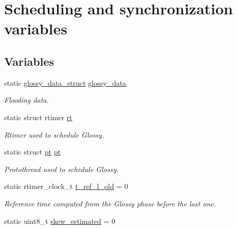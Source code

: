 \hypertarget{group__glossy-test-variables-sched-sync}{
\section{Scheduling and synchronization variables}
\label{group__glossy-test-variables-sched-sync}
}
\subsection*{Variables}
\begin{DoxyCompactItemize}
\item 
\hypertarget{group__glossy-test-variables-sched-sync_ga6bbf497010a2f415af13dbc5c4910f02}{
static \hyperlink{structglossy__data__struct}{glossy\_\-data\_\-struct} \hyperlink{group__glossy-test-variables-sched-sync_ga6bbf497010a2f415af13dbc5c4910f02}{glossy\_\-data}}
\label{group__glossy-test-variables-sched-sync_ga6bbf497010a2f415af13dbc5c4910f02}

\begin{DoxyCompactList}\small\item\em Flooding data. \end{DoxyCompactList}\item 
\hypertarget{group__glossy-test-variables-sched-sync_ga1d5d05d50b1e23d2c49218d89872754b}{
static struct rtimer \hyperlink{group__glossy-test-variables-sched-sync_ga1d5d05d50b1e23d2c49218d89872754b}{rt}}
\label{group__glossy-test-variables-sched-sync_ga1d5d05d50b1e23d2c49218d89872754b}

\begin{DoxyCompactList}\small\item\em Rtimer used to schedule Glossy. \end{DoxyCompactList}\item 
\hypertarget{group__glossy-test-variables-sched-sync_gaf04269db7f30a16bc4016d3b2ae134d5}{
static struct \hyperlink{group__glossy-test-variables-sched-sync_gaf04269db7f30a16bc4016d3b2ae134d5}{pt} \hyperlink{group__glossy-test-variables-sched-sync_gaf04269db7f30a16bc4016d3b2ae134d5}{pt}}
\label{group__glossy-test-variables-sched-sync_gaf04269db7f30a16bc4016d3b2ae134d5}

\begin{DoxyCompactList}\small\item\em Protothread used to schedule Glossy. \end{DoxyCompactList}\item 
static rtimer\_\-clock\_\-t \hyperlink{group__glossy-test-variables-sched-sync_ga46f9e2e4e895cd040435c428e7915b22}{t\_\-ref\_\-l\_\-old} = 0
\begin{DoxyCompactList}\small\item\em Reference time computed from the Glossy phase before the last one. \end{DoxyCompactList}\item 
\hypertarget{group__glossy-test-variables-sched-sync_ga8f7aae7ff4364a1481312cef44f65f73}{
static uint8\_\-t \hyperlink{group__glossy-test-variables-sched-sync_ga8f7aae7ff4364a1481312cef44f65f73}{skew\_\-estimated} = 0}
\label{group__glossy-test-variables-sched-sync_ga8f7aae7ff4364a1481312cef44f65f73}


\end{DoxyCompactItemize}
